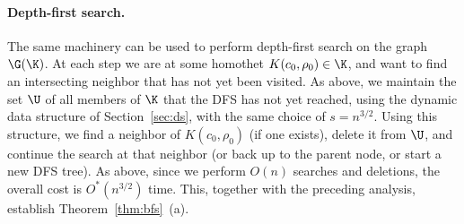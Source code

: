 \paragraph{Depth-first search.}
\fi
The same machinery can be used to perform depth-first search on the graph $\G(\K)$.
At each step we are at some homothet $K(c_0,\rho_0)\in\K$, and want to find an intersecting neighbor 
that has not yet been visited. As above, we maintain the set $\U$ of all members of $\K$ that 
the DFS has not yet reached, using the dynamic data structure of Section~\ref{sec:ds}, with the
same choice of $s=n^{3/2}$. Using this structure, we find a neighbor of $K(c_0,\rho_0)$
(if one exists), delete it from $\U$, and continue the search at that neighbor (or back up
to the parent node, or start a new DFS tree). As above, since we perform
$O(n)$ searches and deletions, the overall cost is $O^*(n^{3/2})$ time. 
This, together with the preceding analysis, establish Theorem~\ref{thm:bfs}~(a).
%
